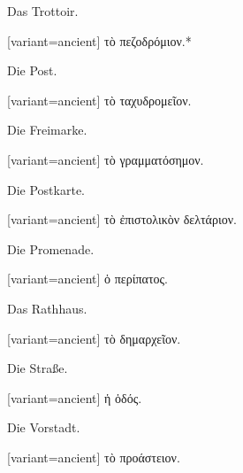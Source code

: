 Das Trottoir.

\switchcolumn

\begin{greek}[variant=ancient]%
τὸ πεζοδρόμιον.{*}

\end{greek}%
\switchcolumn*

Die Post.

\switchcolumn

\begin{greek}[variant=ancient]%
τὸ ταχυδρομεῖον.

\end{greek}%
\switchcolumn*

Die Freimarke.

\switchcolumn

\begin{greek}[variant=ancient]%
τὸ γραμματόσημον.

\end{greek}%
\switchcolumn*

Die Postkarte.

\switchcolumn

\begin{greek}[variant=ancient]%
τὸ ἐπιστολικὸν δελτάριον.

\end{greek}%
\switchcolumn*

Die Promenade.

\switchcolumn

\begin{greek}[variant=ancient]%
ὁ περίπατος.

\end{greek}%
\switchcolumn*

Das Rathhaus.

\switchcolumn

\begin{greek}[variant=ancient]%
τὸ δημαρχεῖον.

\end{greek}%
\switchcolumn*

Die Straße.

\switchcolumn

\begin{greek}[variant=ancient]%
ἡ ὁδός.

\end{greek}%
\switchcolumn*

Die Vorstadt.

\switchcolumn

\begin{greek}[variant=ancient]%
τὸ προάστειον.

\end{greek}%
\switchcolumn*

